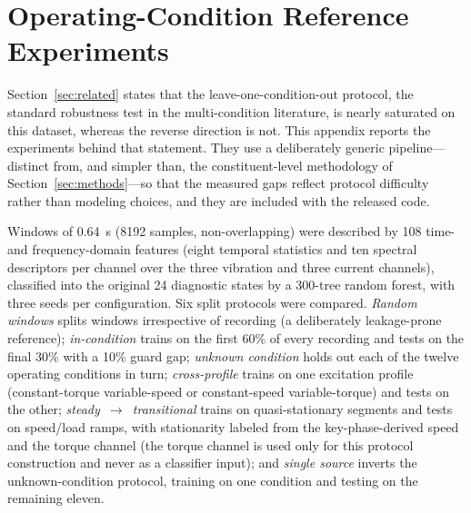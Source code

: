 \section{Operating-Condition Reference Experiments}
\label{app:condition}

Section~\ref{sec:related} states that the leave-one-condition-out protocol,
the standard robustness test in the multi-condition literature, is nearly
saturated on this dataset, whereas the reverse direction is not. This
appendix reports the experiments behind that statement. They use a
deliberately generic pipeline---distinct from, and simpler than, the
constituent-level methodology of Section~\ref{sec:methods}---so that the
measured gaps reflect protocol difficulty rather than modeling choices, and
they are included with the released code.

Windows of 0.64~s (8192 samples, non-overlapping) were described by 108
time- and frequency-domain features (eight temporal statistics and ten
spectral descriptors per channel over the three vibration and three current
channels), classified into the original 24 diagnostic states by a 300-tree
random forest, with three seeds per configuration. Six split protocols were
compared. \emph{Random windows} splits windows irrespective of recording (a
deliberately leakage-prone reference); \emph{in-condition} trains on the
first 60\% of every recording and tests on the final 30\% with a 10\% guard
gap; \emph{unknown condition} holds out each of the twelve operating
conditions in turn; \emph{cross-profile} trains on one excitation profile
(constant-torque variable-speed or constant-speed variable-torque) and
tests on the other; \emph{steady~$\rightarrow$~transitional} trains on
quasi-stationary segments and tests on speed/load ramps, with stationarity
labeled from the key-phase-derived speed and the torque channel (the torque
channel is used only for this protocol construction and never as a
classifier input); and \emph{single source} inverts the unknown-condition
protocol, training on one condition and testing on the remaining eleven.

